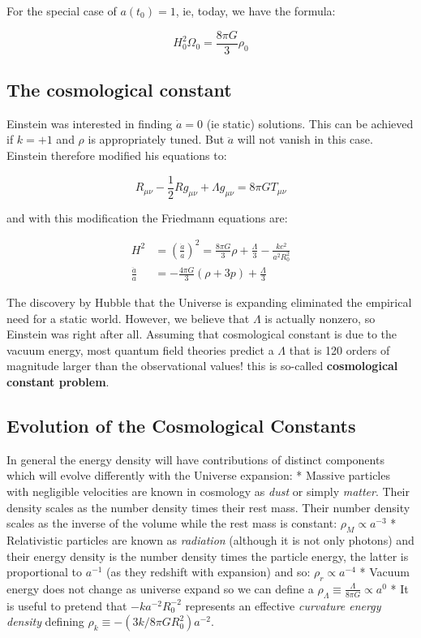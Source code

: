 \documentclass[
  letterpaper,
  DIV=11,
  numbers=noendperiod]{scrreprt}
\begin{document}
For the special case of \(a(t_0) = 1\), ie, today, we have the formula:

\[H_0^2\Omega_0 = \frac{8\pi G}{3}\rho_0\]

\subsection*{The cosmological constant}\label{the-cosmological-constant}

Einstein was interested in finding \(\dot{a} = 0\) (ie static)
solutions. This can be achieved if \(k= + 1\) and \(\rho\) is
appropriately tuned. But \(\ddot a\) will not vanish in this case.
Einstein therefore modified his equations to:

\[R_{\mu\nu} - \frac{1}{2}Rg_{\mu\nu} + \Lambda g_{\mu\nu}= 8 \pi GT_{\mu\nu}\]

and with this modification the Friedmann equations are:

\[
\begin{aligned}
H^2  &=  \left(\frac{\dot a}{a} \right)^2 = \frac{8\pi G}{3}\rho + \frac{\Lambda}{3} - \frac{kc^{2}}{a^2R^2_0} \\
\frac{\ddot a}{a} &= -\frac{4\pi G}{3}(\rho + 3p) +  \frac{\Lambda}{3}
\end{aligned}
\]

The discovery by Hubble that the Universe is expanding eliminated the
empirical need for a static world. However, we believe that \(\Lambda\)
is actually nonzero, so Einstein was right after all. Assuming that
cosmological constant is due to the vacuum energy, most quantum field
theories predict a \(\Lambda\) that is 120 orders of magnitude larger
than the observational values! this is so-called \textbf{cosmological
constant problem}.

\subsection*{Evolution of the Cosmological
Constants}\label{evolution-of-the-cosmological-constants}

In general the energy density will have contributions of distinct
components which will evolve differently with the Universe expansion: *
Massive particles with negligible velocities are known in cosmology as
\emph{dust} or simply \emph{matter}. Their density scales as the number
density times their rest mass. Their number density scales as the
inverse of the volume while the rest mass is constant:
\(\rho_M \propto a^{-3}\) * Relativistic particles are known as
\emph{radiation} (although it is not only photons) and their energy
density is the number density times the particle energy, the latter is
proportional to \(a^{-1}\) (as they redshift with expansion) and so:
\(\rho_r \propto a^{-4}\) * Vacuum energy does not change as universe
expand so we can define a
\(\rho_\Lambda \equiv \frac{\Lambda}{8\pi G} \propto a^0\) * It is
useful to pretend that \(-ka^{-2}R_0^{-2}\) represents an effective
\emph{curvature energy density} defining
\(\rho_k \equiv -(3k/8\pi G R^2_0)a^{-2}\).
\end{document}
